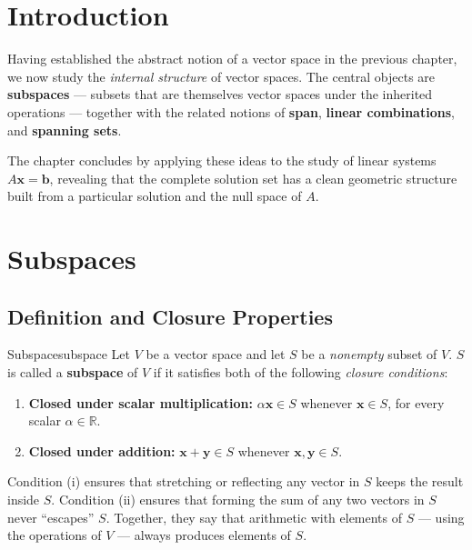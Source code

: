 \documentclass[12pt,a4paper]{article}
\newcommand{\R}{\mathbb{R}}
\newcommand{\vv}[1]{\mathbf{#1}}
\begin{document}
\section{Introduction}

Having established the abstract notion of a vector space in the previous chapter,
we now study the \emph{internal structure} of vector spaces.  The central objects
are \textbf{subspaces} — subsets that are themselves vector spaces under the
inherited operations — together with the related notions of \textbf{span},
\textbf{linear combinations}, and \textbf{spanning sets}.

The chapter concludes by applying these ideas to the study of linear systems
$A\vv{x} = \vv{b}$, revealing that the complete solution set has a clean
geometric structure built from a particular solution and the null space of $A$.

\section{Subspaces}

\subsection{Definition and Closure Properties}

\begin{definition}{Subspace}{subspace}
  Let $V$ be a vector space and let $S$ be a \emph{nonempty} subset of $V$.
  $S$ is called a \textbf{subspace} of $V$ if it satisfies both of the following
  \emph{closure conditions}:
  \begin{enumerate}[label=(\roman*), leftmargin=2.5em]
    \item \textbf{Closed under scalar multiplication:}
          $\alpha\vv{x} \in S$ whenever $\vv{x} \in S$, for every scalar
          $\alpha \in \R$.
    \item \textbf{Closed under addition:}
          $\vv{x} + \vv{y} \in S$ whenever $\vv{x}, \vv{y} \in S$.
  \end{enumerate}
\end{definition}

\noindent
Condition (i) ensures that stretching or reflecting any vector in $S$ keeps the
result inside $S$.  Condition (ii) ensures that forming the sum of any two vectors
in $S$ never ``escapes'' $S$.  Together, they say that arithmetic with elements of
$S$ — using the operations of $V$ — always produces elements of $S$.
\end{document}
